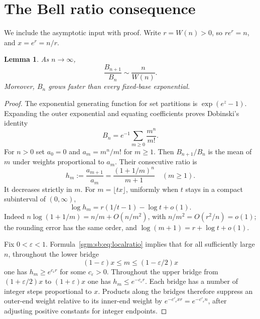 \documentclass[11pt,letterpaper]{article}
\newtheorem{lemma}[theorem]{Lemma}\newtheorem{proposition}[theorem]{Proposition}\newtheorem{corollary}[theorem]{Corollary}
\theoremstyle{remark}\newtheorem{remark}[theorem]{Remark}
\theoremstyle{definition}\newtheorem{definition}[theorem]{Definition}
\begin{document}
\section{The Bell ratio consequence}
We include the asymptotic input with proof. Write $r=W(n)>0$, so $re^r=n$, and $x=e^r=n/r$.

\begin{lemma}\label{sgm:sb:lem:bellratio}
As $n\to\infty$,
\begin{equation}\label{sgm:sb:eq:bellratio}
 \frac{B_{n+1}}{B_n}\sim\frac{n}{W(n)}.
\end{equation}
Moreover, $B_n$ grows faster than every fixed-base exponential.
\end{lemma}
\begin{proof}
The exponential generating function for set partitions is $\exp(e^z-1)$. Expanding the outer exponential and equating coefficients proves Dobinski's identity
\[
 B_n=e^{-1}\sum_{m\ge0}\frac{m^n}{m!}.
\]
For $n>0$ set $a_0=0$ and $a_m=m^n/m!$ for $m\ge1$. Then $B_{n+1}/B_n$ is the mean of $m$ under weights proportional to $a_m$. Their consecutive ratio is
\[
 h_m:=\frac{a_{m+1}}{a_m}
       =\frac{(1+1/m)^n}{m+1}\quad(m\ge1).
\]
It decreases strictly in $m$. For $m=\lfloor tx\rfloor$, uniformly when $t$ stays in a compact subinterval of $(0,\infty)$,
\begin{equation}\label{sgm:sb:eq:localratio}
 \log h_m=r(1/t-1)-\log t+o(1).
\end{equation}
Indeed $n\log(1+1/m)=n/m+O(n/m^2)$, with $n/m^2=O(r^2/n)=o(1)$; the rounding error has the same order, and $\log(m+1)=r+\log t+o(1)$.

Fix $0<\varepsilon<1$. Formula~\eqref{sgm:sb:eq:localratio} implies that for all sufficiently large $n$, throughout the lower bridge
\[
 (1-\varepsilon)x\le m\le(1-\varepsilon/2)x
\]
one has $h_m\ge e^{c_\varepsilon r}$ for some $c_\varepsilon>0$. Throughout the upper bridge from $(1+\varepsilon/2)x$ to $(1+\varepsilon)x$ one has $h_m\le e^{-c_\varepsilon r}$. Each bridge has a number of integer steps proportional to $x$. Products along the bridges therefore suppress an outer-end weight relative to its inner-end weight by $e^{-c'_\varepsilon xr}=e^{-c'_\varepsilon n}$, after adjusting positive constants for integer endpoints.


\end{proof}
\end{document}
